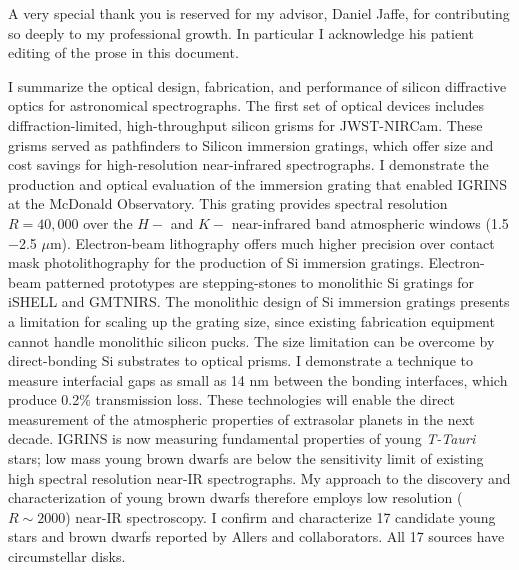 \documentclass[12pt]{report}	%
\begin{document}
\begin{acknowledgments}
A very special thank you is reserved for my advisor, Daniel Jaffe, for contributing so deeply to my professional growth.  In particular I acknowledge his patient editing of the prose in this document.

\end{acknowledgments}


%
\utabstract
{}%
\indent

I summarize the optical design, fabrication, and performance of silicon diffractive optics for astronomical spectrographs.  The first set of optical devices includes diffraction-limited, high-throughput silicon grisms for JWST-NIRCam.  These grisms served as pathfinders to Silicon immersion gratings, which offer size and cost savings for high-resolution near-infrared spectrographs.  I demonstrate the production and optical evaluation of the immersion grating that enabled IGRINS at the McDonald Observatory.  This grating provides spectral resolution $R=40,000$ over the $H-$ and $K-$ near-infrared band atmospheric windows (1.5$-$2.5 $\mu$m).  Electron-beam lithography offers much higher precision over contact mask photolithography for the production of Si immersion gratings.  Electron-beam patterned prototypes are stepping-stones to monolithic Si gratings for iSHELL and GMTNIRS.  The monolithic design of Si immersion gratings presents a limitation for scaling up the grating size, since existing fabrication equipment cannot handle monolithic silicon pucks.  The size limitation can be overcome by direct-bonding Si substrates to optical prisms.  I demonstrate a technique to measure interfacial gaps as small as 14 nm between the bonding interfaces, which produce 0.2\% transmission loss.  These technologies will enable the direct measurement of the atmospheric properties of extrasolar planets in the next decade.  IGRINS is now measuring fundamental properties of young \emph{T-Tauri} stars; low mass young brown dwarfs are below the sensitivity limit of existing high spectral resolution near-IR spectrographs.  My approach to the discovery and characterization of young brown dwarfs therefore employs low resolution ($R\sim 2000$) near-IR spectroscopy.  I confirm and characterize 17 candidate young stars and brown dwarfs reported by Allers and collaborators.  All 17 sources have circumstellar disks.
\end{document}
